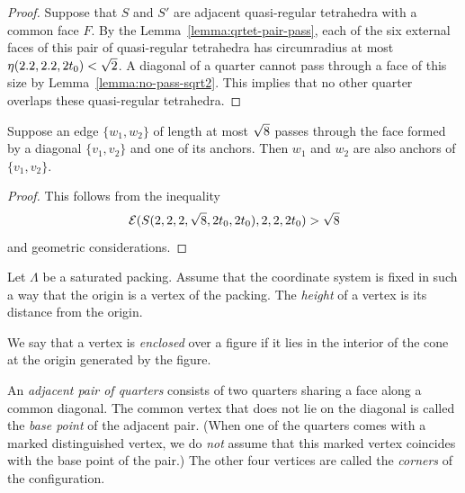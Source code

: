 \begin{proof}
Suppose that $S$ and $S'$ are adjacent quasi-regular tetrahedra
with a common face $F$.   By the
Lemma~\ref{lemma:qrtet-pair-pass}, each of the six external faces
of this pair of quasi-regular tetrahedra has circumradius at most
$\eta(2.2,2.2,2t_0)<\sqrt2$. A diagonal of a quarter  cannot pass
through a face of this size by Lemma~\ref{lemma:no-pass-sqrt2}.
This implies that no other quarter overlaps these quasi-regular
tetrahedra.
\end{proof}


\begin{lemma} \label{lemma:pass-anchor}
Suppose an edge $\{w_1,w_2\}$ of length at most $\sqrt8$ passes
through the face formed by a diagonal $\{v_1,v_2\}$ and one of its
anchors. Then $w_1$ and $w_2$ are also anchors of $\{v_1,v_2\}$.
\end{lemma}

\begin{proof}  This follows from
the inequality
  $${{\mathcal E}}(S(2,2,2,\sqrt8,2t_0,2t_0),2,2,2t_0) > \sqrt8$$
and geometric considerations.
\end{proof}


\begin{definition} \label{def:height}  Let $\Lambda$ be a
saturated packing.  Assume that the coordinate system is fixed in
such a way that the origin is a vertex of the packing.  The {\it
height\/} of a vertex is its distance from the
origin.
%
\end{definition}

\begin{definition} \label{def:enclosed}
We say that a vertex is {\it enclosed\/} over a figure
if it lies in the interior of the
cone at the origin generated by the figure.
%
\end{definition}


\begin{definition} \label{def:corner}
An {\it adjacent pair of quarters} consists of two quarters
sharing a face along a common diagonal. The common vertex that
does not lie on the diagonal is called the {\it base point\/} of
the adjacent pair.  (When one of the quarters comes with a marked
distinguished vertex, we do {\it not\/} assume that this marked
vertex coincides with the base point of the pair.)  The other four
vertices are called the {\it corners\/}  of the configuration.
%
\end{definition}

